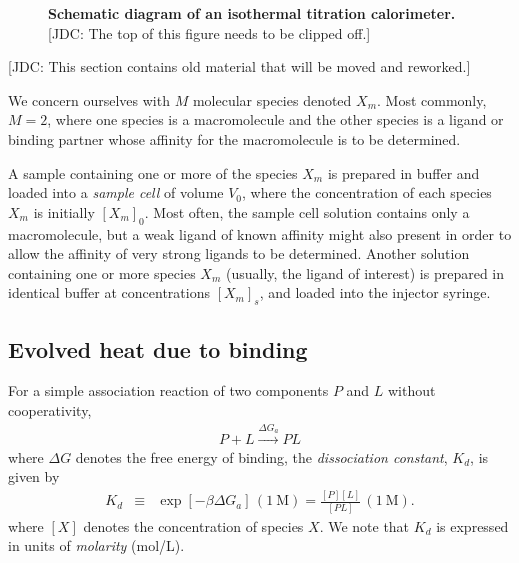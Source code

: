\documentclass[aps,pre,twocolumn,nofootinbib,superscriptaddress,linenumbers]{revtex4-1}
\begin{document}
\begin{figure} 
\caption{\label{figure:itc-diagram} {\bf Schematic diagram of an isothermal titration calorimeter.} {\color{red} [JDC: The top of this figure needs to be clipped off.]}} 
\end{figure}

\color{red}
[JDC: This section contains old material that will be moved and reworked.]

We concern ourselves with $M$ molecular species denoted $X_m$.
Most commonly, $M = 2$, where one species is a macromolecule and the other species is a ligand or binding partner whose affinity for the macromolecule is to be determined.

A sample containing one or more of the species $X_m$ is prepared in buffer and loaded into a \emph{sample cell} of volume $V_0$, where the concentration of each species $X_m$ is initially $[X_m]_0$.
Most often, the sample cell solution contains only a macromolecule, but a weak ligand of known affinity might also present in order to allow the affinity of very strong ligands to be determined.
Another solution containing one or more species $X_m$ (usually, the ligand of interest) is prepared in identical buffer at concentrations $[X_m]_s$, and loaded into the injector syringe.


\subsection{Evolved heat due to binding}

For a simple association reaction of two components $P$ and $L$ without cooperativity,
\begin{eqnarray}
P + L \stackrel{\Delta G_a}{\rightarrow} PL \nonumber
\end{eqnarray}
where $\Delta G$ denotes the free energy of binding, the \emph{dissociation constant}, $K_d$, is given by
\begin{eqnarray}
K_d &\equiv& \exp[-\beta \Delta G_a] \, (1 \: \mathrm{M}) = \frac{[P] [L]}{[PL]} \, (1 \: \mathrm{M}) . \label{equation:two-component-binding-model}
\end{eqnarray}
where $[X]$ denotes the concentration of species $X$.
We note that $K_d$ is expressed in units of \emph{molarity} (mol/L).
\end{document}
